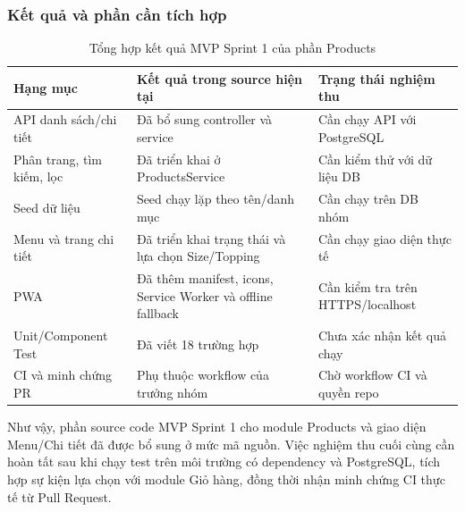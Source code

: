 \subsubsection{Kết quả và phần cần tích hợp}

\begin{table}[htbp]
\centering
\small
\caption{Tổng hợp kết quả MVP Sprint 1 của phần Products}
\begin{tabular}{|p{}|p{}|p{}|}
\hline
\textbf{Hạng mục} & \textbf{Kết quả trong source hiện tại} & \textbf{Trạng thái nghiệm thu} \\
\hline
API danh sách/chi tiết & Đã bổ sung controller và service & Cần chạy API với PostgreSQL \\
\hline
Phân trang, tìm kiếm, lọc & Đã triển khai ở ProductsService & Cần kiểm thử với dữ liệu DB \\
\hline
Seed dữ liệu & Seed chạy lặp theo tên/danh mục & Cần chạy trên DB nhóm \\
\hline
Menu và trang chi tiết & Đã triển khai trạng thái và lựa chọn Size/Topping & Cần chạy giao diện thực tế \\
\hline
PWA & Đã thêm manifest, icons, Service Worker và offline fallback & Cần kiểm tra trên HTTPS/localhost \\
\hline
Unit/Component Test & Đã viết 18 trường hợp & Chưa xác nhận kết quả chạy \\
\hline
CI và minh chứng PR & Phụ thuộc workflow của trưởng nhóm & Chờ workflow CI và quyền repo \\
\hline
\end{tabular}
\end{table}

Như vậy, phần source code MVP Sprint 1 cho module Products và giao diện Menu/Chi tiết đã được bổ sung ở mức mã nguồn. Việc nghiệm thu cuối cùng cần hoàn tất sau khi chạy test trên môi trường có dependency và PostgreSQL, tích hợp sự kiện lựa chọn với module Giỏ hàng, đồng thời nhận minh chứng CI thực tế từ Pull Request.
